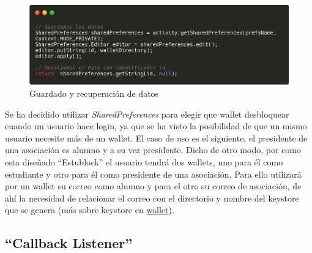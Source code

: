% 

\begin{figure}[h!]
  \centering
  \includegraphics[width=0.8\linewidth]{figs/Desarrollo/SDK/sharedPref}
  \caption[Guardado y recuperación de datos]{Guardado y recuperación de datos}
  \label{fig:sharedPref}
\end{figure}

Se ha decidido utilizar \emph{SharedPreferences} para elegir que wallet desbloquear cuando un usuario hace login, ya que se ha visto la posibilidad de que un mismo usuario necesite más de un wallet. El caso de uso es el siguiente, el presidente de una asociación es alumno y a su vez presidente. Dicho de otro modo, por como esta diseñado ``Estublock'' el usuario tendrá dos wallets, uno para él como estudiante y otro para él como presidente de una asociación. Para ello utilizará por un wallet su correo como alumno y para el otro su correo de asociación, de ahí la necesidad de relacionar el correo con el directorio y nombre del keystore que se genera (más sobre keystore en \hyperref[sec:wallet]{wallet}).

\subsection{``Callback Listener''}

